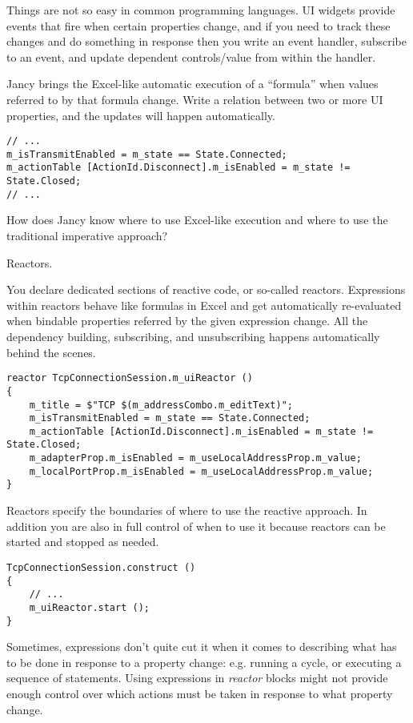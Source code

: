 \documentclass[oneside]{book}
\begin{document}
Things are not so easy in common programming languages. UI widgets provide events that fire when certain properties change, and if you need to track these changes and do something in response then you write an event handler, subscribe to an event, and update dependent controls/value from within the handler.

Jancy brings the Excel-like automatic execution of a “formula” when values referred to by that formula change. Write a relation between two or more UI properties, and the updates will happen automatically.

\begin{lstlisting}
// ...  
m_isTransmitEnabled = m_state == State.Connected;
m_actionTable [ActionId.Disconnect].m_isEnabled = m_state != State.Closed;
// ...
\end{lstlisting}

How does Jancy know where to use Excel-like execution and where to use the traditional imperative approach?

Reactors.

You declare dedicated sections of reactive code, or so-called reactors. Expressions within reactors behave like formulas in Excel and get automatically re-evaluated when bindable properties referred by the given expression change. All the dependency building, subscribing, and unsubscribing happens automatically behind the scenes.

\begin{lstlisting}
reactor TcpConnectionSession.m_uiReactor ()
{
    m_title = $"TCP $(m_addressCombo.m_editText)";
    m_isTransmitEnabled = m_state == State.Connected;
    m_actionTable [ActionId.Disconnect].m_isEnabled = m_state != State.Closed;
    m_adapterProp.m_isEnabled = m_useLocalAddressProp.m_value;
    m_localPortProp.m_isEnabled = m_useLocalAddressProp.m_value;
}
\end{lstlisting}

Reactors specify the boundaries of where to use the reactive approach. In addition you are also in full control of when to use it because reactors can be started and stopped as needed.

\begin{lstlisting}
TcpConnectionSession.construct ()
{
    // ...
    m_uiReactor.start ();
}
\end{lstlisting}

Sometimes, expressions don't quite cut it when it comes to describing what has to be done in response to a property change: e.g. running a cycle, or executing a sequence of statements. Using expressions in \emph{reactor} blocks might not provide enough control over which actions must be taken in response to what property change.
\end{document}

